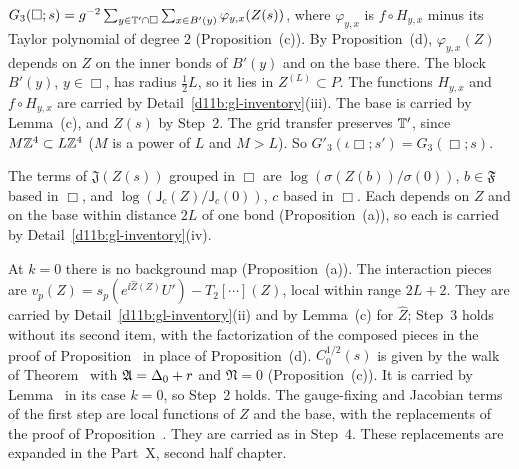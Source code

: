 \begin{step}
$G_3(\Box;s)=g^{-2}\sum_{y\in\mathbb T'\cap\Box}\sum_{x\in B'(y)}\varphi_{y,x}(Z(s))$, where $\varphi_{y,x}$ is $f\circ H_{y,x}$ minus its Taylor polynomial of degree $2$ (Proposition~(c)). By Proposition~(d), $\varphi_{y,x}(Z)$ depends on $Z$ on the inner bonds of $B'(y)$ and on the base there. The block $B'(y)$, $y\in\Box$, has radius $\frac12L$, so it lies in $Z^{(L)}\subset P$. The functions $H_{y,x}$ and $f\circ H_{y,x}$ are carried by Detail~\ref{d11b:gl-inventory}(iii). The base is carried by Lemma~(c), and $Z(s)$ by Step~2. The grid transfer preserves $\mathbb T'$, since $M\mathbb Z^4\subset L\mathbb Z^4$ ($M$ is a power of $L$ and $M>L$). So $G'_3(\iota\Box;s')=G_3(\Box;s)$.

The terms of $\mathfrak J(Z(s))$ grouped in $\Box$ are $\log(\sigma(Z(b))/\sigma(0))$, $b\in\mathfrak F$ based in $\Box$, and $\log(\mathsf J_c(Z)/\mathsf J_c(0))$, $c$ based in $\Box$. Each depends on $Z$ and on the base within distance $2L$ of one bond (Proposition~(a)), so each is carried by Detail~\ref{d11b:gl-inventory}(iv).
\end{step}

\begin{step}
At $k=0$ there is no background map (Proposition~(a)). The interaction pieces are $v_p(Z)=s_p(e^{\ii\hat Z(Z)}U')-T_2[\cdots](Z)$, local within range $2L+2$. They are carried by Detail~\ref{d11b:gl-inventory}(ii) and by Lemma~(c) for $\hat Z$; Step~3 holds without its second item, with the factorization of the composed pieces in the proof of Proposition~ in place of Proposition~(d). $C_0^{1/2}(s)$ is given by the walk of Theorem~ with $\mathfrak A=\Delta_0+r$ and $\mathfrak N=0$ (Proposition~(c)). It is carried by Lemma~ in its case $k=0$, so Step~2 holds. The gauge-fixing and Jacobian terms of the first step are local functions of $Z$ and the base, with the replacements of the proof of Proposition~. They are carried as in Step~4. These replacements are expanded in the Part~X, second half chapter.
\end{step}

